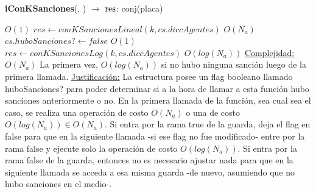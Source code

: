 \begin{Algoritmos}
\begin{algorithm}[H]{\textbf{iConKSanciones}(, ) $\to$ $\res$: conj(placa)}
  \begin{algorithmic}
    	\Comment $O(1)$
    	\State $res \gets conKSancionesLineal(k,cs.diccAgentes)$	\Comment $O(N_{a})$
        \State $cs.huboSanciones? \gets false$	\Comment $O(1)$
    \Else
    	\State $res \gets conKSancionesLog(k,cs.diccAgentes)$	\Comment $O(log(N_{a}))$
    \EndIf
    \medskip
	\Statex \underline{Complejidad:} $O(N_{a})$ La primera vez, $O(log(N_{a}))$ si no hubo ninguna sanci\'on luego de la primera llamada.
    \Statex \underline{Justificaci\'on:} La estructura posee un flag booleano llamado huboSanciones? para poder determinar si a la hora de llamar a esta funci\'on hubo sanciones anteriormente o no. En la primera llamada de la funci\'on, sea cual sea el caso, se realiza una operaci\'on de costo $O(N_{a})$ o una de costo $O(log(N_{a})) \in O(N_{a})$. Si entra por la rama true de la guarda, deja el flag en false para que en la siguiente llamada -si ese flag no fue modificado- entre por la rama false y ejecute solo la operaci\'on de costo $O(log(N_{a}))$. Si entra por la rama false de la guarda, entonces no es necesario ajustar nada para que en la siguiente llamada se acceda a esa misma guarda -de nuevo, asumiendo que no hubo sanciones en el medio-.
  \end{algorithmic}
\end{algorithm}

  
  


\end{Algoritmos}
